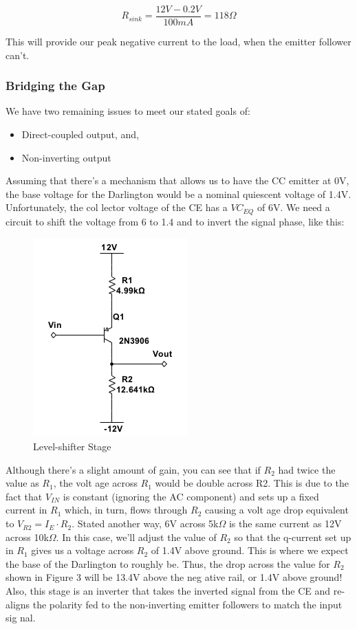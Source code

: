 \documentclass[journal]{IEEEtran}
\begin{document}
\begin{equation}
R_{sink} = \frac{12V - 0.2V}{100mA} = 118\Omega
\end{equation}

This will provide our peak negative current to the load, when the emitter follower can’t.

\subsubsection{Bridging the Gap}

We have two remaining issues to meet our stated goals of:

\begin{itemize}
\item
Direct-coupled output, and,
\item
Non-inverting output
\end{itemize}

Assuming that there’s a mechanism that allows us to have the CC emitter at 0V, the base
voltage for the Darlington would be a nominal quiescent voltage of 1.4V. Unfortunately, the col
lector voltage of the CE has a $VC_{EQ}$ of 6V. We need a circuit to shift the voltage from 6 to 1.4 and
to invert the signal phase, like this:

\begin{figure}[H]
\centering
\includegraphics[scale=.6]{shift-stage.png}
\caption{Level-shifter Stage}
\label{fig_ls_stage}
\end{figure}

Although there's a slight amount of gain, you can see that if $R_{2}$ had twice the value as $R_{1}$, the volt
age across $R_{1}$ would be double across R2. This is due to the fact that $V_{IN}$ is constant (ignoring the
AC component) and sets up a fixed current in $R_{1}$ which, in turn, flows through $R_{2}$ causing a volt
age drop equivalent to $V_{R2} = I_{E}\cdot R_{2}$. Stated another way, 6V across 5k$\Omega$ is the same current as
12V across 10k$\Omega$. In this case, we’ll adjust the value of $R_{2}$ so that the q-current set up in $R_{1}$ gives
us a voltage across $R_{2}$ of 1.4V above ground. This is where we expect the base of the Darlington to
roughly be. Thus, the drop across the value for $R_{2}$ shown in Figure 3 will be 13.4V above the neg
ative rail, or 1.4V above ground! Also, this stage is an inverter that takes the inverted signal from
the CE and re-aligns the polarity fed to the non-inverting emitter followers to match the input sig
nal.
\end{document}
